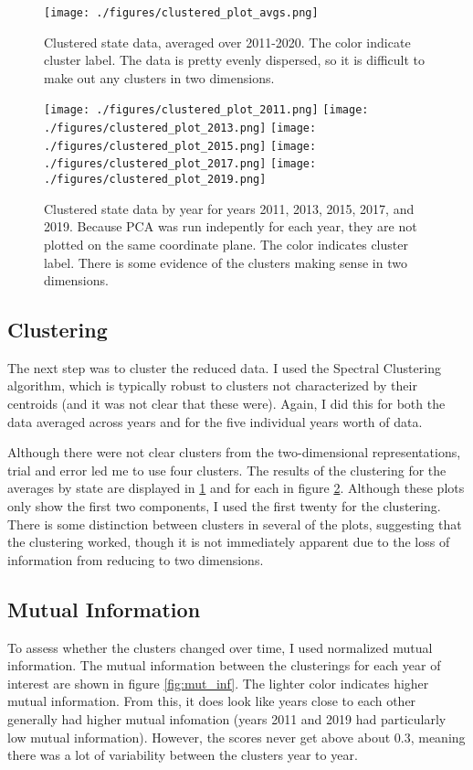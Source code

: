 \documentclass[11pt]{article}
\begin{document}
\begin{figure}[hp]
\texttt{[image: ./figures/clustered\_plot\_avgs.png]}
\caption{
  Clustered state data, averaged over 2011-2020. The color indicate cluster label. The data is pretty evenly dispersed, so it is difficult to make out any clusters in two dimensions. 
}
\label{fig:clustered_avgs}
\end{figure}

\begin{figure}[hp]
\texttt{[image: ./figures/clustered\_plot\_2011.png]}
\texttt{[image: ./figures/clustered\_plot\_2013.png]}
\texttt{[image: ./figures/clustered\_plot\_2015.png]}
\texttt{[image: ./figures/clustered\_plot\_2017.png]}
\texttt{[image: ./figures/clustered\_plot\_2019.png]}
\caption{
  Clustered state data by year for years 2011, 2013, 2015, 2017, and 2019. Because PCA was run indepently for each year, they are not plotted on the same coordinate plane. The color indicates cluster label. There is some evidence of the clusters making sense in two dimensions.
}
\label{fig:clustered_data}
\end{figure}

\subsection{Clustering}
The next step was to cluster the reduced data. I used the Spectral Clustering algorithm, which is typically robust to clusters not characterized by their centroids (and it was not clear that these were). Again, I did this for both the data averaged across years and for the five individual years worth of data. 

Although there were not clear clusters from the two-dimensional representations, trial and error led me to use four clusters. The results of the clustering for the averages by state are displayed in \ref{fig:clustered_avgs} and for each in figure \ref{fig:clustered_data}. Although these plots only show the first two components, I used the first twenty for the clustering. There is some distinction between clusters in several of the plots, suggesting that the clustering worked, though it is not immediately apparent due to the loss of information from reducing to two dimensions.

\subsection{Mutual Information}
To assess whether the clusters changed over time, I used normalized mutual information. The mutual information between the clusterings for each year of interest are shown in figure \ref{fig:mut_inf}. The lighter color indicates higher mutual information. From this, it does look like years close to each other generally had higher mutual infomation (years 2011 and 2019 had particularly low mutual information). However, the scores never get above about 0.3, meaning there was a lot of variability between the clusters year to year. 
\end{document}
